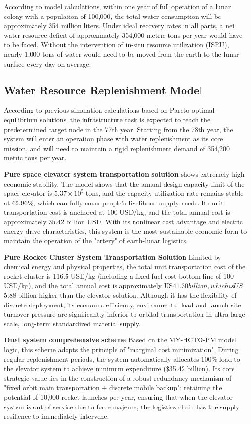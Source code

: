 \indent According to model calculations, within one year of full operation of a lunar colony with a population of 100,000, the total water consumption will be approximately 354 million liters.
Under ideal recovery rates in all parts, a net water resource deficit of approximately 354,000 metric tons per year would have to be faced.
Without the intervention of in-situ resource utilization (ISRU), nearly 1,000 tons of water would need to be moved from the earth to the lunar surface every day on average.

\subsection{Water Resource Replenishment Model}
According to previous simulation calculations based on Pareto optimal equilibrium solutions, the infrastructure task is expected to reach the predetermined target node in the 77th year. Starting from the 78th year, the system will enter an operation phase with water replenishment as its core mission, and will need to maintain a rigid replenishment demand of 354,200 metric tons per year.

\textbf{Pure space elevator system transportation solution} shows extremely high economic stability. The model shows that the annual design capacity limit of the space elevator is $5.37 \times 10^5$ tons, and the capacity utilization rate remains stable at 65.96\%, which can fully cover people's livelihood supply needs. Its unit transportation cost is anchored at 100 USD/kg, and the total annual cost is approximately 35.42 billion USD. With its nonlinear cost advantage and electric energy drive characteristics, this system is the most sustainable economic form to maintain the operation of the "artery" of earth-lunar logistics.

\textbf{Pure Rocket Cluster System Transportation Solution} Limited by chemical energy and physical properties, the total unit transportation cost of the rocket cluster is 116.6 USD/kg (including a fixed fuel cost bottom line of 100 USD/kg), and the total annual cost is approximately US$41.30 billion, which is US$5.88 billion higher than the elevator solution. Although it has the flexibility of discrete deployment, its economic efficiency, environmental load and launch site turnover pressure are significantly inferior to orbital transportation in ultra-large-scale, long-term standardized material supply.

\textbf{Dual system comprehensive scheme} Based on the MY-HCTO-PM model logic, this scheme adopts the principle of "marginal cost minimization". During regular replenishment periods, the system automatically allocates 100\% load to the elevator system to achieve minimum expenditure (\$35.42 billion). Its core strategic value lies in the construction of a robust redundancy mechanism of "fixed orbit main transportation + discrete mobile backup": retaining the potential of 10,000 rocket launches per year, ensuring that when the elevator system is out of service due to force majeure, the logistics chain has the supply resilience to immediately intervene.
